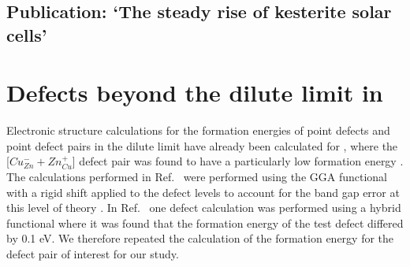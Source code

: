 \documentclass[11pt, twoside]{report}
\begin{document}
\subsection{Publication: `The steady rise of kesterite solar cells'}






\section{Defects beyond the dilute limit in {\CZTS}}\label{CZTS_beyond_dilute}
Electronic structure calculations for the formation energies of point defects and point defect pairs in the dilute limit have already been calculated for {\CZTS}, where the [$Cu_{Zn}^- + Zn_{Cu}^+$] defect pair was found to have a particularly low formation energy \cite{defects_Chen}.
The calculations performed in Ref.~ were performed using the GGA functional with a rigid shift applied to the defect levels to account for the band gap error at this level of theory \cite{Lany_defects}. In Ref.~ one defect calculation was performed using a hybrid functional where it was found that the formation energy of the test defect differed by 0.1 eV. We therefore repeated the calculation of the formation energy for the defect pair of interest for our study.
\end{document}
